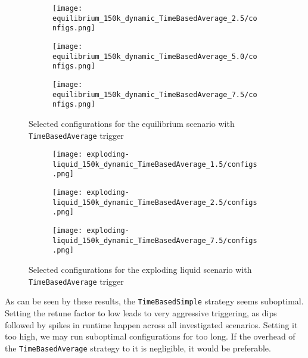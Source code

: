 \documentclass[]{article}
\begin{document}
\begin{figure}[H]
	\begin{center}
				\begin{subfigure}[b]{0.3\textwidth}
			\texttt{[image: equilibrium\_150k\_dynamic\_TimeBasedAverage\_2.5/configs.png]}
		\end{subfigure}
		\begin{subfigure}[b]{0.3\textwidth}
			\texttt{[image: equilibrium\_150k\_dynamic\_TimeBasedAverage\_5.0/configs.png]}
		\end{subfigure}
		\begin{subfigure}[b]{0.3\textwidth}
			\texttt{[image: equilibrium\_150k\_dynamic\_TimeBasedAverage\_7.5/configs.png]}
		\end{subfigure}
	\end{center}
	\caption[]{Selected configurations for the equilibrium scenario with \texttt{TimeBasedAverage} trigger}
	\label{fig_equil_configs_dyn_avg}
\end{figure}

\begin{figure}[H]
	\begin{center}
				\begin{subfigure}[b]{0.3\textwidth}
					\texttt{[image: exploding-liquid\_150k\_dynamic\_TimeBasedAverage\_1.5/configs.png]}
				\end{subfigure}
		\begin{subfigure}[b]{0.3\textwidth}
			\texttt{[image: exploding-liquid\_150k\_dynamic\_TimeBasedAverage\_2.5/configs.png]}
		\end{subfigure}
		\begin{subfigure}[b]{0.3\textwidth}
			\texttt{[image: exploding-liquid\_150k\_dynamic\_TimeBasedAverage\_7.5/configs.png]}
		\end{subfigure}
	\end{center}
	\caption[]{Selected configurations for the exploding liquid scenario with \texttt{TimeBasedAverage} trigger}
	\label{fig_expl_configs_dyn_avg}
\end{figure}


As can be seen by these results, the \texttt{TimeBasedSimple} strategy seems suboptimal. Setting the retune factor to low leads to very aggressive triggering, as dips followed by spikes in runtime happen across all investigated scenarios. Setting it too high, we may run suboptimal configurations for too long. If the overhead of the \texttt{TimeBasedAverage} strategy to it is negligible, it would be preferable.
\end{document}

